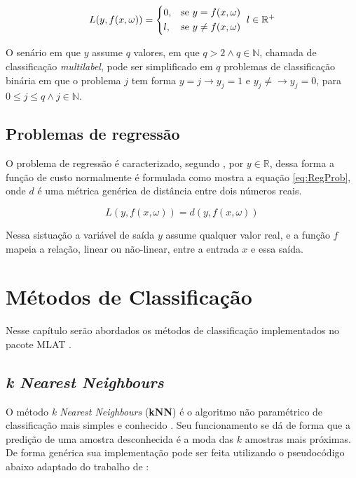\begin{equation}
{	
	 L(y, f(x, \omega)) = \begin{dcases*}
	0,  & se $y = f(x, \omega)$ \\
	l,  & se $y \ne f(x, \omega)$ 
	\end{dcases*} \\ 
	l \in \mathbb {R^+}
}
\label{eq:ClassProb}
\end{equation}

O senário em que $y$ assume $q$ valores, em que $q > 2 \land q \in \mathbb {N}$, chamada de classificação \textit{multilabel}, pode ser simplificado em $q$ problemas de classificação binária em que o problema $j$ tem forma $y = j \rightarrow y_j = 1$ e $y_j \neq  \rightarrow y_j = 0 $, para $ 0 \leq j \leq q \land j \in \mathbb {N}$.


\subsection{Problemas de regressão}
O problema de regressão é caracterizado, segundo , por $y \in \mathbb {R}$, dessa forma a função de custo normalmente é formulada como mostra a equação \ref{eq:RegProb}, onde $d$ é uma métrica genérica de distância entre dois números reais.

\begin{equation}
L(y, f(x, \omega)) = d(y, f(x, \omega))
\label{eq:RegProb}
\end{equation}

Nessa sistuação a variável de saída $y$ assume qualquer valor real, e a função $f$ mapeia a relação, linear ou não-linear, entre a entrada $x$ e essa saída.


\section{Métodos de Classificação} 
Nesse capítulo serão abordados os métodos de classificação implementados no pacote MLAT \cite{PauloCirinoMLAT}. 

\subsection{\textit{k Nearest Neighbours}}
O método \textit{k Nearest Neighbours} (\textbf{kNN}) é o algoritmo não paramétrico de classificação mais simples e conhecido \cite{James20131} . Seu funcionamento se dá de forma que a predição de uma amostra desconhecida é a moda das $k$ amostras mais próximas. De forma genérica sua implementação pode ser feita utilizando o pseudocódigo abaixo adaptado do trabalho de  :

